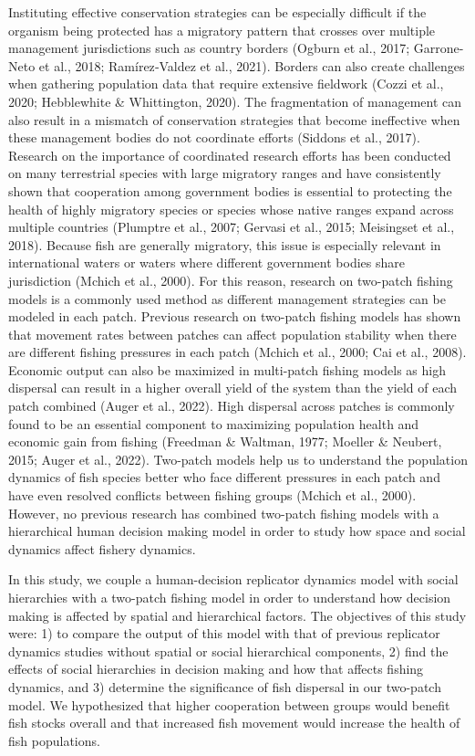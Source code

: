 \documentclass[
  12pt,
]{article}
\begin{document}
Instituting effective conservation strategies can be especially difficult if the organism being protected has a migratory pattern that crosses over multiple management jurisdictions such as country borders (Ogburn et al., 2017; Garrone-Neto et al., 2018; Ramírez‐Valdez et al., 2021). Borders can also create challenges when gathering population data that require extensive fieldwork (Cozzi et al., 2020; Hebblewhite \& Whittington, 2020). The fragmentation of management can also result in a mismatch of conservation strategies that become ineffective when these management bodies do not coordinate efforts (Siddons et al., 2017). Research on the importance of coordinated research efforts has been conducted on many terrestrial species with large migratory ranges and have consistently shown that cooperation among government bodies is essential to protecting the health of highly migratory species or species whose native ranges expand across multiple countries (Plumptre et al., 2007; Gervasi et al., 2015; Meisingset et al., 2018). Because fish are generally migratory, this issue is especially relevant in international waters or waters where different government bodies share jurisdiction (Mchich et al., 2000). For this reason, research on two-patch fishing models is a commonly used method as different management strategies can be modeled in each patch. Previous research on two-patch fishing models has shown that movement rates between patches can affect population stability when there are different fishing pressures in each patch (Mchich et al., 2000; Cai et al., 2008). Economic output can also be maximized in multi-patch fishing models as high dispersal can result in a higher overall yield of the system than the yield of each patch combined (Auger et al., 2022). High dispersal across patches is commonly found to be an essential component to maximizing population health and economic gain from fishing (Freedman \& Waltman, 1977; Moeller \& Neubert, 2015; Auger et al., 2022). Two-patch models help us to understand the population dynamics of fish species better who face different pressures in each patch and have even resolved conflicts between fishing groups (Mchich et al., 2000). However, no previous research has combined two-patch fishing models with a hierarchical human decision making model in order to study how space and social dynamics affect fishery dynamics.

In this study, we couple a human-decision replicator dynamics model with social hierarchies with a two-patch fishing model in order to understand how decision making is affected by spatial and hierarchical factors. The objectives of this study were: 1) to compare the output of this model with that of previous replicator dynamics studies without spatial or social hierarchical components, 2) find the effects of social hierarchies in decision making and how that affects fishing dynamics, and 3) determine the significance of fish dispersal in our two-patch model. We hypothesized that higher cooperation between groups would benefit fish stocks overall and that increased fish movement would increase the health of fish populations.
\end{document}
